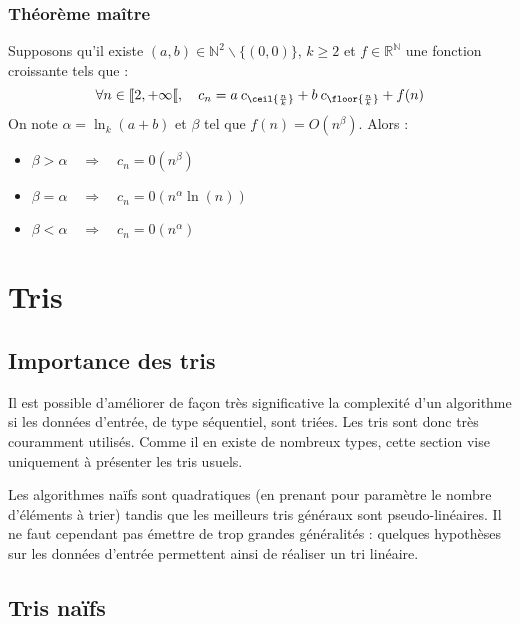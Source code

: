 \documentclass{hibiscus}
\begin{document}
\subsubsection{Théorème maître}

Supposons qu'il existe $(a, b) \in \mathbb{N}^2\backslash\{(0, 0)\}$, $k \geq 2$ et $f \in \mathbb{R}^{\mathbb{N}}$  une fonction croissante tels que :
\begin{equation*}
\forall n \in \text{\textlbrackdbl} 2, + \infty \text{\textlbrackdbl}, \quad c_n =
  a \: c_{\ceil{\frac{n}{k}}}
+ b \: c_{\floor{\frac{n}{k}}}
+ f(n)
\end{equation*}
On note $\alpha = \ln_k(a+b)$ et $\beta$ tel que $f(n) = O(n^\beta)$. Alors :
\begin{itemize}
\item $\beta > \alpha \quad \Rightarrow \quad c_n = 0(n^\beta)$
\item $\beta = \alpha \quad \Rightarrow \quad c_n = 0(n^\alpha\ln(n))$
\item $\beta < \alpha \quad \Rightarrow \quad c_n = 0(n^\alpha)$
\end{itemize}


\newpage \section{Tris}

\subsection{Importance des tris}

\par Il est possible d'améliorer de façon très significative la complexité d'un algorithme si les données d'entrée, de type séquentiel, sont triées. Les tris sont donc très couramment utilisés. Comme il en existe de nombreux types, cette section vise uniquement à présenter les tris usuels.

\medskip \par Les algorithmes naïfs sont quadratiques (en prenant pour paramètre le nombre d'éléments à trier) tandis que les meilleurs tris généraux sont pseudo-linéaires. Il ne faut cependant pas émettre de trop grandes généralités : quelques hypothèses sur les données d'entrée permettent ainsi de réaliser un tri linéaire.

\subsection{Tris naïfs}
\end{document}
